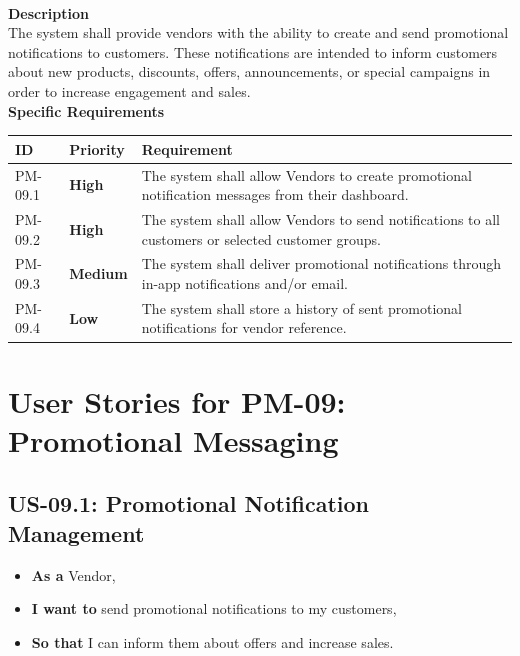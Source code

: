 \\
\textbf{Description}\\
The system shall provide vendors with the ability to create and send promotional notifications to customers. These notifications are intended to inform customers about new products, discounts, offers, announcements, or special campaigns in order to increase engagement and sales.\\
\textbf{Specific Requirements}
\begin{table}[H]
\centering
\label{tab:promotional-requirements}
\begin{tabular}{>{\raggedright\arraybackslash}p{2cm}>{\centering\arraybackslash}p{2cm}>{\raggedright\arraybackslash}p{10cm}}
\toprule
\textbf{ID} & \textbf{Priority} & \textbf{Requirement} \\
\midrule
PM-09.1 & \textcolor{highcolor}{\textbf{High}} & The system shall allow Vendors to create promotional notification messages from their dashboard. \\
\midrule
PM-09.2 & \textcolor{highcolor}{\textbf{High}} & The system shall allow Vendors to send notifications to all customers or selected customer groups. \\
\midrule
PM-09.3 & \textcolor{mediumcolor}{\textbf{Medium}} & The system shall deliver promotional notifications through in-app notifications and/or email. \\
\midrule
PM-09.4 & \textcolor{lowcolor}{\textbf{Low}} & The system shall store a history of sent promotional notifications for vendor reference. \\
\bottomrule
\end{tabular}
\end{table}
\section*{User Stories for PM-09: Promotional Messaging}

\subsection*{US-09.1: Promotional Notification Management}
\begin{itemize}
    \item \textbf{As a} Vendor,
    \item \textbf{I want to} send promotional notifications to my customers,
    \item \textbf{So that} I can inform them about offers and increase sales.
\end{itemize}

